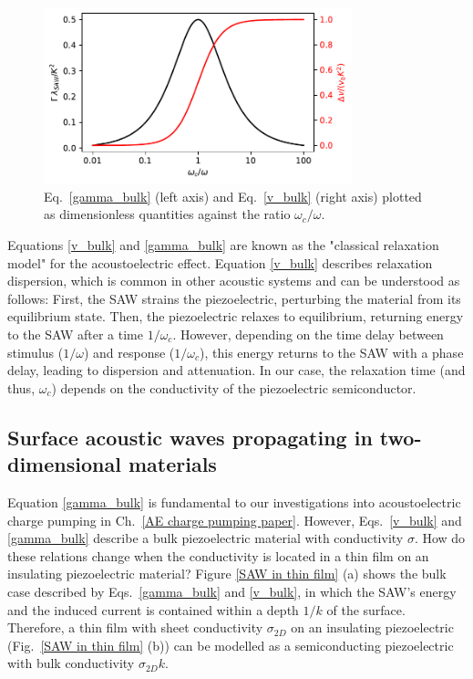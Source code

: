 \documentclass{beavtex_dub_edit}
\begin{document}
\begin{figure}
    \includegraphics[width=0.8\textwidth]{gamma_and_v.pdf}
    \caption{Eq.\ \ref{gamma_bulk} (left axis) and Eq.\ \ref{v_bulk} (right axis) plotted as dimensionless quantities against the ratio $\omega_c/\omega$.}
    \label{gamma_and_v}
\end{figure}

Equations \ref{v_bulk} and \ref{gamma_bulk} are known as the "classical relaxation model" for the acoustoelectric effect. Equation \ref{v_bulk} describes relaxation dispersion, which is common in other acoustic systems \cite{hutson_elastic_1962, rudenko_dispersive_2022} and can be understood as follows: First, the SAW strains the piezoelectric, perturbing the material from its equilibrium state. Then, the piezoelectric relaxes to equilibrium, returning energy to the SAW after a time $1/\omega_c$. However, depending on the time delay between stimulus ($1/\omega$) and response ($1/\omega_c$), this energy returns to the SAW with a phase delay, leading to dispersion and attenuation. In our case, the relaxation time (and thus, $\omega_c$) depends on the conductivity of the piezoelectric semiconductor. 

\subsection{Surface acoustic waves propagating in two-dimensional materials} \label{SAW theory, propagating in 2D materials}

Equation \ref{gamma_bulk} is fundamental to our investigations into acoustoelectric charge pumping in Ch.\ \ref{AE charge pumping paper}. However, Eqs.\ \ref{v_bulk} and \ref{gamma_bulk} describe a bulk piezoelectric material with conductivity $\sigma$. How do these relations change when the conductivity is located in a thin film on an insulating piezoelectric material? Figure \ref{SAW in thin film} (a) shows the bulk case described by Eqs.\ \ref{gamma_bulk} and \ref{v_bulk}, in which the SAW's energy and the induced current is contained within a depth $1/k$ of the surface. Therefore, a thin film with sheet conductivity $\sigma_{2D}$ on an insulating piezoelectric (Fig.\ \ref{SAW in thin film} (b)) can be modelled as a semiconducting piezoelectric with bulk conductivity $\sigma_{2D}k$.
\end{document}
